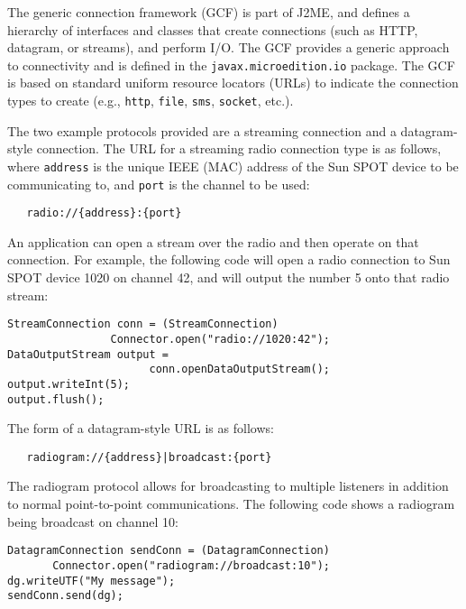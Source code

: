 \documentclass{sigplanconf}
\begin{document}
The generic connection framework (GCF) is part of J2ME, and defines a hierarchy of interfaces and classes that create connections (such as HTTP, datagram, or streams), and perform I/O. The GCF provides a generic approach to connectivity and is defined in the \texttt{javax.microedition.io} package. The GCF is based on standard uniform resource locators (URLs) to indicate the connection types to create (e.g., \texttt{http}, \texttt{file}, \texttt{sms}, 
\texttt{socket}, etc.).

The two example protocols provided are a streaming connection and a datagram-style 
connection. The URL for a streaming radio connection type is as follows,
where \texttt{address} is the unique IEEE (MAC) address of the Sun SPOT 
device to be communicating to, and \texttt{port} is the channel to be 
used: 

\begin{verbatim}
   radio://{address}:{port}
\end{verbatim}

An application can open a stream over the radio and 
then operate on that connection.  
For example, the following code will open a radio connection 
to Sun SPOT device 1020 on channel 42, and will output the
number 5 onto that radio stream: 

\begin{verbatim}
StreamConnection conn = (StreamConnection)
                Connector.open("radio://1020:42");
DataOutputStream output = 
                      conn.openDataOutputStream();
output.writeInt(5);
output.flush();
\end{verbatim}

The form of a datagram-style URL is as follows:

\begin{verbatim}
   radiogram://{address}|broadcast:{port}
\end{verbatim}

The radiogram protocol allows for broadcasting to multiple listeners in
addition to normal point-to-point communications.
The following code shows a radiogram being broadcast on channel 10:

\begin{verbatim}
DatagramConnection sendConn = (DatagramConnection) 
       Connector.open("radiogram://broadcast:10");
dg.writeUTF("My message");
sendConn.send(dg);
\end{verbatim}
\end{document}

